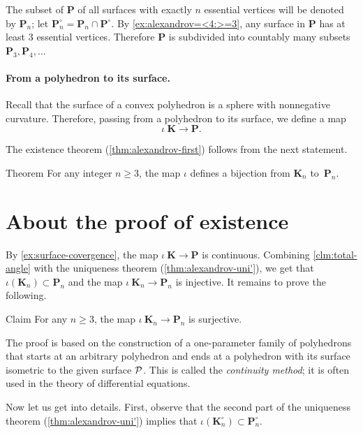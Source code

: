 The subset of $\bm{P}$ of all surfaces with exactly $n$ essential vertices will be denoted by $\bm{P}_n$; let $\bm{P}_n^\circ=\bm{P}_n\cap \bm{P}^\circ$.
By \ref{ex:alexandrov=<4:>=3}, any surface in $\bm{P}$ has at least 3 essential vertices.
Therefore $\bm{P}$ is subdivided into countably many subsets $\bm{P}_3,\bm{P}_4,\dots$

\paragraph{From a polyhedron to its surface.}
Recall that the surface of a convex polyhedron is a sphere with nonnegative curvature.
Therefore, passing from a polyhedron to its surface, we define a map
\[\iota\:\bm{K}\to \bm{P}.\]

The existence theorem (\ref{thm:alexandrov-first}) follows from the next statement.

\begin{thm}{Theorem}\label{thm:reformulation}
For any integer $n\ge 3$,
the map $\iota$ defines a bijection from $\bm{K}_n$ to~$\bm{P}_n$.
\end{thm}

\section{About the proof of existence}

By \ref{ex:surface-covergence}, the map $\iota\:\bm{K}\to\bm{P}$ is continuous.
Combining \ref{clm:total-angle} with the uniqueness theorem (\ref{thm:alexandrov-uni'}), we get that $\iota(\bm{K}_n)\subset \bm{P}_n$ and the map $\iota\:\bm{K}_n\to\bm{P}_n$ is injective.
It remains to prove the following.

\begin{thm}{Claim}\label{clm:surjective}
For any $n\ge 3$, the map $\iota\:\bm{K}_n\to\bm{P}_n$ is surjective.
\end{thm}

The proof is based on the construction of a one-parameter family of polyhedrons that starts at an arbitrary polyhedron
and ends at a polyhedron with its surface isometric to the given surface $\mathcal{P}$.
This is called the \emph{continuity method}; it is often used in the theory of differential equations.

\medskip

Now let us get into details.
First, observe that the second part of the uniqueness theorem (\ref{thm:alexandrov-uni'}) implies that $\iota(\bm{K}_n^\circ)\subset \bm{P}_n^\circ$.

